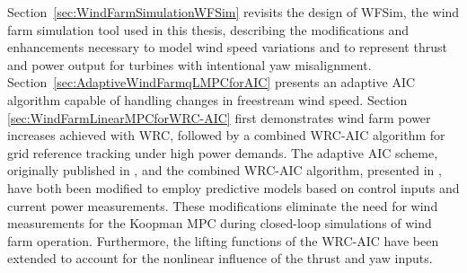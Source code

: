 Section~\ref{sec:WindFarmSimulationWFSim} revisits the design of WFSim, the wind farm simulation tool used in this thesis, describing the modifications and enhancements necessary to model wind speed variations and to represent thrust and power output for turbines with intentional yaw misalignment. Section~\ref{sec:AdaptiveWindFarmqLMPCforAIC} presents an adaptive AIC algorithm capable of handling changes in freestream wind speed. Section \ref{sec:WindFarmLinearMPCforWRC-AIC} first demonstrates wind farm power increases achieved with WRC, followed by a combined WRC-AIC algorithm for grid reference tracking under high power demands. The adaptive AIC scheme, originally published in \cite{dittmer2022data}, and the combined WRC-AIC algorithm, presented in \cite{dittmer2023koopman}, have both been modified to employ predictive models based on control inputs and current power measurements. These modifications eliminate the need for wind measurements for the Koopman MPC during closed-loop simulations of wind farm operation. Furthermore, the lifting functions of the WRC-AIC have been extended to account for the nonlinear influence of the thrust and yaw inputs.

